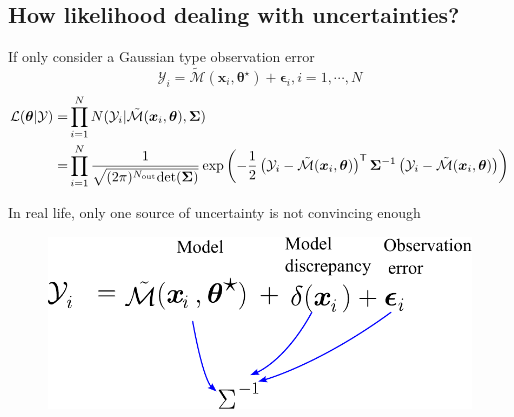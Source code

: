 \subsection{How likelihood dealing with uncertainties?}
\begin{frame}
    

\begin{block}{If only consider a Gaussian type observation error}
\begin{equation*}
\mathcal{Y}_i = \tilde{\mathcal{M}}(\boldsymbol{x}_i,\boldsymbol{\theta}^{\star}) +\boldsymbol{\epsilon}_{i}, i=1,\cdots,N
\end{equation*}
\begin{equation*}        
        \label{eq: Likelihood function}
        \begin{aligned}
         \mathcal{L}(\boldsymbol{\theta}|\mathcal{Y}) =& \prod_{i=1}^{N} N(\mathcal{Y}_{i}|\tilde{\mathcal{M}}(\boldsymbol{x}_i,\boldsymbol{\theta}),\boldsymbol{\Sigma}) \\
         =& \prod_{i=1}^{N}\frac{1}{\sqrt{(2 \pi)^{N_{\rm{out}}}{\rm{det}}         (\boldsymbol{\Sigma})}}\exp\left(-\frac{1}{2}\left(\mathcal{Y}_{i} - \tilde{\mathcal{M}}(\boldsymbol{x}_i,\boldsymbol{\theta})\right)^{\mathsf{T}} \boldsymbol{\Sigma}^{-1}\left(\mathcal{Y}_{i} - \tilde{\mathcal{M}}(\boldsymbol{x}_i,\boldsymbol{\theta})\right)\right) 
        \end{aligned}
        \end{equation*}  
\end{block}

\begin{alertblock}{In real life, only one source of uncertainty is not convincing enough}
\begin{figure}[!ht]       \includegraphics[scale=0.55]{figures/figure-CoVUncertainty.pdf}
\end{figure}
    
\end{alertblock}


\end{frame}
